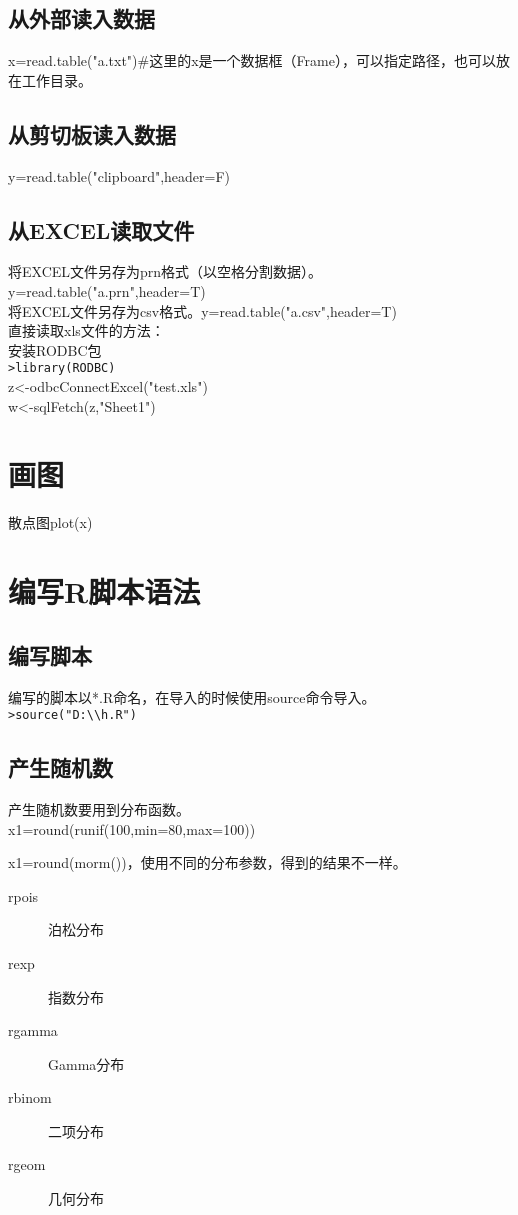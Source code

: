 \documentclass[a4paper,12pt]{ctexbook}
\begin{document}
\begin{flushleft}
\subsection{从外部读入数据}
x=read.table("a.txt")\#这里的x是一个数据框（Frame），可以指定路径，也可以放在工作目录。
\subsection{从剪切板读入数据}
y=read.table("clipboard",header=F)
\subsection{从EXCEL读取文件}
将EXCEL文件另存为prn格式（以空格分割数据）。y=read.table("a.prn",header=T)\\
将EXCEL文件另存为csv格式。y=read.table("a.csv",header=T)\\

直接读取xls文件的方法：\\
安装RODBC包\\
\verb|>library(RODBC)|\\
z<-odbcConnectExcel("test.xls")\\
w<-sqlFetch(z,"Sheet1")

\section{画图}
散点图plot(x)

\section{编写R脚本语法}
\subsection{编写脚本}
编写的脚本以*.R命名，在导入的时候使用source命令导入。\\
\verb|>source("D:\\h.R")|

\subsection{产生随机数}
产生随机数要用到分布函数。\\
x1=round(runif(100,min=80,max=100))

x1=round(morm())，使用不同的分布参数，得到的结果不一样。
\begin{description}
	\item[rpois] 泊松分布
	\item[rexp] 指数分布
	\item[rgamma] Gamma分布
	\item[rbinom] 二项分布
	\item[rgeom] 几何分布
\end{description}


\end{flushleft}
\end{document}
